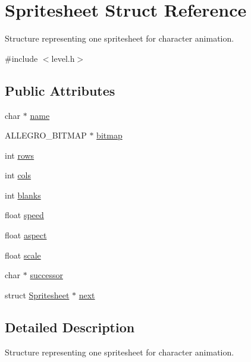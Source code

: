 \hypertarget{structSpritesheet}{\section{Spritesheet Struct Reference}
\label{structSpritesheet}
}


Structure representing one spritesheet for character animation.  




{\ttfamily \#include $<$level.\+h$>$}

\subsection*{Public Attributes}
\begin{DoxyCompactItemize}
\item 
char $\ast$ \hyperlink{structSpritesheet_a6788d53f825bd74cda7e50e75435befa}{name}
\item 
A\+L\+L\+E\+G\+R\+O\+\_\+\+B\+I\+T\+M\+A\+P $\ast$ \hyperlink{structSpritesheet_ad31be6e59349586862e6a813ea139bcb}{bitmap}
\item 
int \hyperlink{structSpritesheet_aeab321ce6cdd45cc8a5078e80480510e}{rows}
\item 
int \hyperlink{structSpritesheet_a3d512755ce492a35e1816fe026cc37c9}{cols}
\item 
int \hyperlink{structSpritesheet_a5010b18959949b1c577078f94a810ef3}{blanks}
\item 
float \hyperlink{structSpritesheet_ad011770ca540de2bad85f0cb155c774b}{speed}
\item 
float \hyperlink{structSpritesheet_a85c93c8d80227725374e1581c4c8e049}{aspect}
\item 
float \hyperlink{structSpritesheet_ac46cf3d01609f66aae140e3b7d3d1109}{scale}
\item 
char $\ast$ \hyperlink{structSpritesheet_a8132723c6e2d6b939b11852062eefe67}{successor}
\item 
struct \hyperlink{structSpritesheet}{Spritesheet} $\ast$ \hyperlink{structSpritesheet_a671f77f759138aa2c852e5252b6daac5}{next}
\end{DoxyCompactItemize}


\subsection{Detailed Description}
Structure representing one spritesheet for character animation. 

